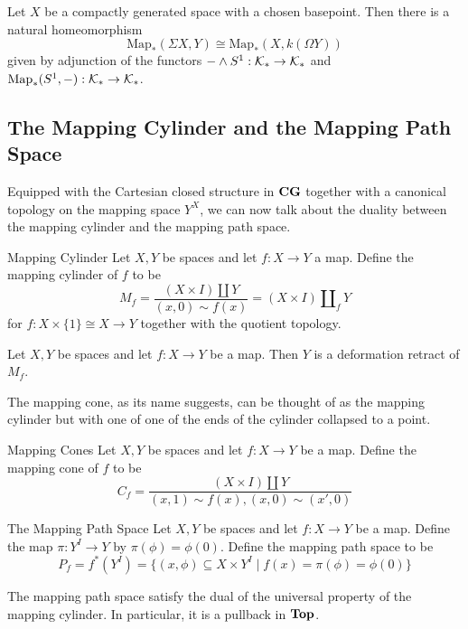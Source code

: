 \documentclass[a4paper]{article}
\begin{document}
\begin{crl}{}{} Let $X$ be a compactly generated space with a chosen basepoint. Then there is a natural homeomorphism $$\text{Map}_\ast(\Sigma X,Y)\cong\text{Map}_\ast(X,k(\Omega Y))$$ given by adjunction of the functors $-\wedge S^1:\mathcal{K}_\ast\to\mathcal{K}_\ast$ and $\text{Map}_\ast(S^1,-):\mathcal{K}_\ast\to\mathcal{K}_\ast$. 
\end{crl}

\subsection{The Mapping Cylinder and the Mapping Path Space}
Equipped with the Cartesian closed structure in $\bold{CG}$ together with a canonical topology on the mapping space $Y^X$, we can now talk about the duality between the mapping cylinder and the mapping path space. 

\begin{defn}{Mapping Cylinder}{} Let $X,Y$ be spaces and let $f:X\to Y$ a map. Define the mapping cylinder of $f$ to be $$M_f=\frac{(X\times I)\amalg Y}{(x,0)\sim f(x)}=(X\times I)\amalg_fY$$ for $f:X\times\{1\}\cong X\to Y$ together with the quotient topology. 
\end{defn}

\begin{lmm}{}{} Let $X,Y$ be spaces and let $f:X\to Y$ be a map. Then $Y$ is a deformation retract of $M_f$. 
\end{lmm}

The mapping cone, as its name suggests, can be thought of as the mapping cylinder but with one of one of the ends of the cylinder collapsed to a point. 

\begin{defn}{Mapping Cones}{} Let $X,Y$ be spaces and let $f:X\to Y$ be a map. Define the mapping cone of $f$ to be $$C_f=\frac{(X\times I)\amalg Y}{(x,1)\sim f(x),(x,0)\sim(x',0)}$$
\end{defn}

\begin{defn}{The Mapping Path Space}{} Let $X,Y$ be spaces and let $f:X\to Y$ be a map. Define the map $\pi:Y^I\to Y$ by $\pi(\phi)=\phi(0)$. Define the mapping path space to be $$P_f=f^\ast(Y^I)=\{(x,\phi)\subseteq X\times Y^I\;|\;f(x)=\pi(\phi)=\phi(0)\}$$
\end{defn}

The mapping path space satisfy the dual of the universal property of the mapping cylinder. In particular, it is a pullback in $\bold{Top}$. 
\end{document}
